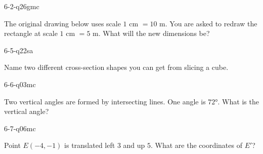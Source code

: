 \begin{practiceQuestion}{6-2-q26}{gmc}
\begin{questionText}
The original drawing below uses scale $1$ cm $= 10$ m. You are asked to redraw the rectangle at scale $1$ cm $= 5$ m. What will the new dimensions be?

\begin{center}
\end{center}
\end{questionText}
\end{practiceQuestion}

\begin{practiceQuestion}{6-5-q22}{sa}
\begin{questionText}
Name two different cross-section shapes you can get from slicing a cube.
\end{questionText}
\end{practiceQuestion}

\begin{practiceQuestion}{6-6-q03}{mc}
\begin{questionText}
Two vertical angles are formed by intersecting lines. One angle is $72°$. What is the vertical angle?
\end{questionText}
\end{practiceQuestion}

\begin{practiceQuestion}{6-7-q06}{mc}
\begin{questionText}
Point $E(-4, -1)$ is translated left $3$ and up $5$. What are the coordinates of $E'$?
\end{questionText}
\end{practiceQuestion}

